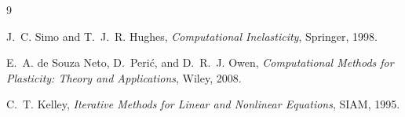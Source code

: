 \begin{thebibliography}{9}

J.~C. Simo and T.~J.~R. Hughes,
\emph{Computational Inelasticity},
Springer, 1998.

E.~A. de Souza Neto, D.~Peri\'{c}, and D.~R.~J. Owen,
\emph{Computational Methods for Plasticity: Theory and Applications},
Wiley, 2008.

C.~T. Kelley,
\emph{Iterative Methods for Linear and Nonlinear Equations},
SIAM, 1995.

\end{thebibliography}
